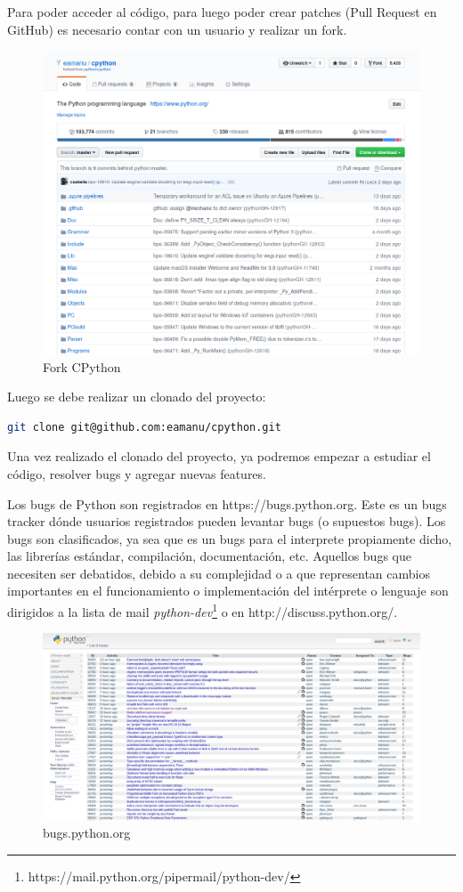 \documentclass[12pt,a4paper,titlepage]{article}
\begin{document}
Para poder acceder al código, para luego poder crear patches (Pull Request en GitHub)
es necesario contar con un usuario y realizar un fork. 

\begin{figure}[H]
	\centering
	\includegraphics[width=0.7\linewidth]{fork}
	\caption[Fork CPython]{Fork CPython}
	\label{fig:fork}
\end{figure}

Luego se debe realizar un clonado del proyecto:

\begin{lstlisting}[language=Bash]
git clone git@github.com:eamanu/cpython.git
\end{lstlisting}

Una vez realizado el clonado del proyecto, ya podremos empezar a estudiar el código,
resolver bugs y agregar nuevas features.

Los bugs de Python son registrados en https://bugs.python.org. Este es un bugs tracker
dónde usuarios registrados pueden levantar bugs (o supuestos bugs). Los bugs son 
clasificados, ya sea que es un bugs para el interprete propiamente dicho, las librerías
estándar, compilación, documentación, etc. Aquellos bugs que necesiten ser debatidos, 
debido a su complejidad o a que representan cambios importantes en el funcionamiento o 
implementación del intérprete o lenguaje son dirigidos a la lista de mail 
\textit{python-dev}\footnote{https://mail.python.org/pipermail/python-dev/} o en 
http://discuss.python.org/.

\begin{figure}[H]
	\centering
	\includegraphics[width=0.7\linewidth]{bpo}
	\caption{bugs.python.org}
	\label{fig:bpo}
\end{figure}
\end{document}
